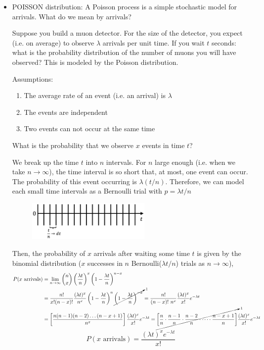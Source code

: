 \documentclass[12pt]{article}
\numberwithin{equation}{section}
\begin{document}
\begin{itemize}
\item POISSON distribution: A Poisson process is a simple stochastic model for arrivals. What do we mean by arrivals?

Suppose you build a muon detector. For the size of the detector, you expect (i.e. on average) to observe $ \lambda $ arrivals per unit time. If you wait $ t $ seconds: what is the probability distribution of the number of muons you will have observed? This is modeled by the Poisson distribution.

Assumptions:
\begin{enumerate}
	\item The average rate of an event (i.e. an arrival) is $ \lambda $
	\item The events are independent
	\item Two events can not occur at the same time
\end{enumerate}

What is the probability that we observe $ x $ events in time $ t $?

We break up the time $ t $ into $ n $ intervals. For $ n $ large enough (i.e. when we take $ n\to\infty $), the time interval is so short that, at most, one event can occur. The probability of this event occurring is $ \lambda (t/n) $. Therefore, we can model each small time intervals as a Bernoulli trial with $ p=\lambda t/n $ 

\begin{figure}[H]
	\centering
	\includegraphics[width=6cm] {poi}
\end{figure}

Then, the probability of $ x $ arrivals after waiting some time $ t $ is given by the binomial distribution ($ x $ successes in $ n $ Bernoulli($ \lambda t/n $) trials as $ n\to\infty $), 
{\footnotesize
\begin{align*}
		P(x \text{ arrivals}) &= \lim_{n\to\infty} {n \choose x} \left(\frac{\lambda t}{n}\right)^x \left(1-\frac{\lambda t}{n}\right)^{n-x}\\
		&= \frac{n!}{x!(n-x)!}\frac{(\lambda t)^x}{n^x}\left(1-\frac{\lambda t}{n}\right)^{n} \cancelto{_1}{\left(1-\frac{\lambda t}{n}\right)^{-x}}= \frac{n!}{(n-x)!\ n^x}\frac{(\lambda t)^x}{x!} e^{-\lambda t} \\
		&= \left[\frac{n(n-1)(n-2)\dots (n-x+1)}{n^x}\right]\frac{(\lambda t)^x}{x!}  e^{-\lambda t}= \cancelto{_1}{\left[ \frac{n}{n} \cdot \frac{n-1}{n} \cdot \frac{n-2}{n} \cdot \dots \cdot \frac{n-x+1}{n} \right]}\frac{(\lambda t)^x}{x!}  e^{-\lambda t}\\
\end{align*}}
\begin{equation}
		P(x \text{ arrivals}) = \frac{(\lambda t)^x  e^{-\lambda t}}{x!}
\end{equation}


\end{itemize}
\end{document}
